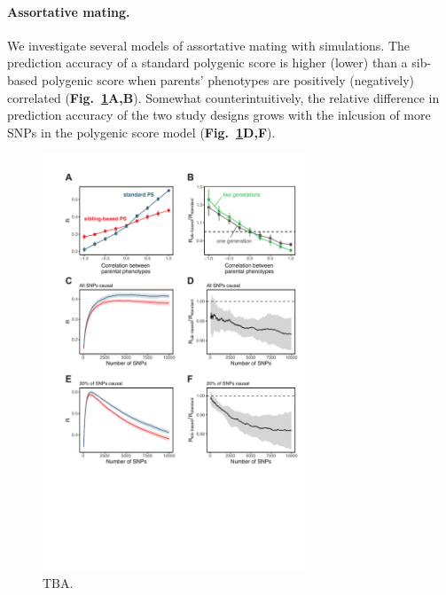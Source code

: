 \documentclass[hidelinks, 12pt]{article}
\begin{document}
\paragraph{Assortative mating.}  We investigate several models of assortative mating with simulations. The prediction accuracy of a standard polygenic score is higher (lower) than a sib-based polygenic score when parents' phenotypes are positively (negatively) correlated ({\bf Fig.~\ref{fig_assort_mate}A,B}).  Somewhat counterintuitively, the relative difference in prediction accuracy of the two study designs grows with the inlcusion of more SNPs in the polygenic score model ({\bf Fig.~\ref{fig_assort_mate}D,F}).

\pagebreak

\begin{figure}[!th]
\centering
\includegraphics[width=0.7\textwidth]{supp_figures/assort_mate.pdf}
\caption[Prediction accuracy in sib and standard GWAS in the presence of assortative mating.]{\small TBA.}
\label{fig_assort_mate}
\end{figure}

\pagebreak
\end{document}
